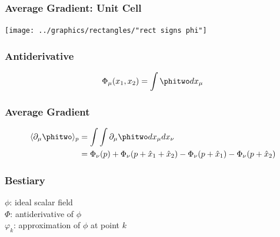 \documentclass[handout]{beamer}
\begin{document}
\begin{frame}
  \frametitle{Average Gradient: Unit Cell}  %
  \begin{center}
    \texttt{[image: ../graphics/rectangles/"rect signs phi"]}
  \end{center}
\end{frame}

\begin{frame}
  \frametitle{Antiderivative}  %
  $$\Phi_{\mu}(x_{1}, x_{2}) = \int \phitwo dx_{\mu}$$
\end{frame}

\begin{frame}
  \frametitle{Average Gradient}  %
\begin{equation*}
  \begin{split}
    \langle \partial_{\mu} \phitwo \rangle_{p} 
      &= \int \int \partial_{\mu} \phitwo dx_{\mu} dx_{\nu} \\
      &= \Phi_{\nu}(p) + \Phi_{\nu}(p + \hat{x}_{1} + \hat{x}_{2}) - \Phi_{\nu}(p + \hat{x}_{1}) - \Phi_{\nu}(p + \hat{x}_{2})
  \end{split}
\end{equation*}
\end{frame}

\begin{frame}
  \frametitle{Bestiary}  %
  $\phi$: ideal scalar field  \\ [15pt]
  $\Phi$: antiderivative of $\phi$ \\[15pt]
  $\varphi_{k}$: approximation of $\phi$ at point $k$ 
\end{frame}
\end{document}
